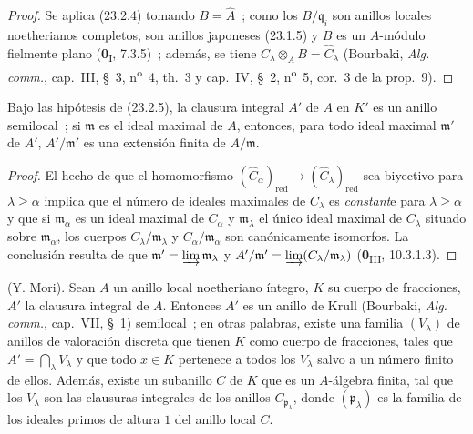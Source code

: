 
\begin{proof}
Se aplica (23.2.4) tomando $B=\widehat A$~; como los
$B/\mathfrak q_i$ son anillos locales noetherianos completos, son anillos
japoneses (23.1.5) y $B$ es un $A$-módulo fielmente plano
(\textbf{0}\textsubscript{I}, 7.3.5)~; además, se tiene
$C_\lambda\otimes_AB=\widehat C_\lambda$ (Bourbaki, \emph{Alg. comm.},
cap.~III, §~3, n\textsuperscript{o}~4, th.~3 y cap.~IV, §~2,
n\textsuperscript{o}~5, cor.~3 de la prop.~9).
\end{proof}

\begin{corollary}[23.2.6]
\label{0.23.2.6-es}
Bajo las hipótesis de \textup{(23.2.5)}, la clausura integral $A'$ de $A$ en
$K'$ es un anillo semilocal~; si $\mathfrak m$ es el ideal maximal de $A$,
entonces, para todo ideal maximal $\mathfrak m'$ de $A'$,
$A'/\mathfrak m'$ es una extensión finita de $A/\mathfrak m$.
\end{corollary}

\begin{proof}
El hecho de que el homomorfismo
$(\widehat C_\alpha)_{\mathrm{red}}\to
(\widehat C_\lambda)_{\mathrm{red}}$ sea biyectivo para
$\lambda\geqslant\alpha$ implica que el número de ideales maximales de
$C_\lambda$ es \emph{constant}e para $\lambda\geqslant\alpha$ y que si
$\mathfrak m_\alpha$ es un ideal maximal de $C_\alpha$ y
$\mathfrak m_\lambda$ el único ideal maximal de $C_\lambda$ situado sobre
$\mathfrak m_\alpha$, los cuerpos $C_\lambda/\mathfrak m_\lambda$ y
$C_\alpha/\mathfrak m_\alpha$ son canónicamente isomorfos. La conclusión
resulta de que $\mathfrak m'=\varinjlim\mathfrak m_\lambda$ y
$A'/\mathfrak m'=\varinjlim(C_\lambda/\mathfrak m_\lambda)$
(\textbf{0}\textsubscript{III}, 10.3.1.3).
\end{proof}

\begin{proposition}[23.2.7]
\label{0.23.2.7-es}
\textnormal{(Y. Mori).} Sean $A$ un anillo local noetheriano íntegro, $K$ su
cuerpo de fracciones, $A'$ la clausura integral de $A$. Entonces $A'$ es un
anillo de Krull \textup{(Bourbaki, \emph{Alg. comm.}, cap.~VII, §~1)} semilocal~;
en otras palabras, existe una familia $(V_\lambda)$ de anillos de valoración
discreta que tienen $K$ como cuerpo de fracciones, tales que
$A'=\bigcap_\lambda V_\lambda$ y que todo $x\in K$ pertenece a todos los
$V_\lambda$ salvo a un número finito de ellos. Además, existe un
subanillo $C$ de $K$ que es un $A$-álgebra finita, tal que los
$V_\lambda$ son las clausuras integrales de los anillos
$C_{\mathfrak p_\lambda}$, donde $(\mathfrak p_\lambda)$ es la familia de los
ideales primos de altura $1$ del anillo local $C$.
\end{proposition}

